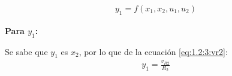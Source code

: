   \begin{align*}
    \tag{Salida $y_1$}
    y_1 = f(x_1, x_2, u_1, u_2)
  \end{align*}

  \noindent\textbf{Para $y_1$:}

    Se sabe que $y_1$ es $x_2$, por lo que de la ecuación \ref{eq:1.2:3:vr2}:
    \begin{align*}
      y_1 = \frac{v_{R2}}{R_2}
    \end{align*}
